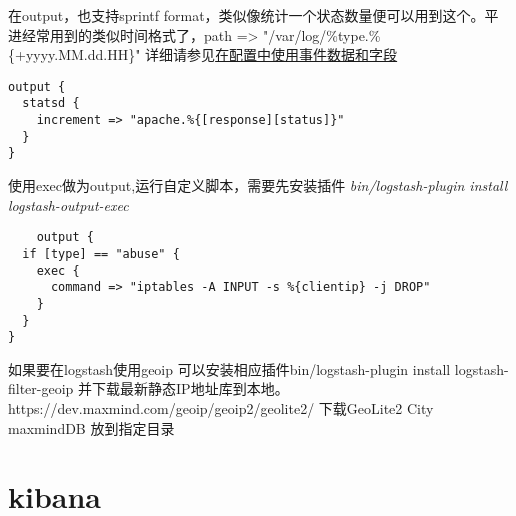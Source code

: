 在output，也支持sprintf format，类似像统计一个状态数量便可以用到这个。平进经常用到的类似时间格式了，path => "/var/log/\%{type}.\%\{+yyyy.MM.dd.HH\}" 详细请参见\href{https://www.elastic.co/guide/en/logstash/current/event-dependent-configuration.html}{在配置中使用事件数据和字段}
\begin{lstlisting}
output {
  statsd {
    increment => "apache.%{[response][status]}"
  }
}
\end{lstlisting}

使用exec做为output,运行自定义脚本，需要先安装插件 \textit{ bin/logstash-plugin install logstash-output-exec}

\begin{lstlisting}
	output {
  if [type] == "abuse" {
    exec {
      command => "iptables -A INPUT -s %{clientip} -j DROP"
    }
  }
}
\end{lstlisting}

如果要在logstash使用geoip 可以安装相应插件bin/logstash-plugin install logstash-filter-geoip  并下载最新静态IP地址库到本地。https://dev.maxmind.com/geoip/geoip2/geolite2/  下载GeoLite2 City maxmindDB 放到指定目录

\section{kibana}


